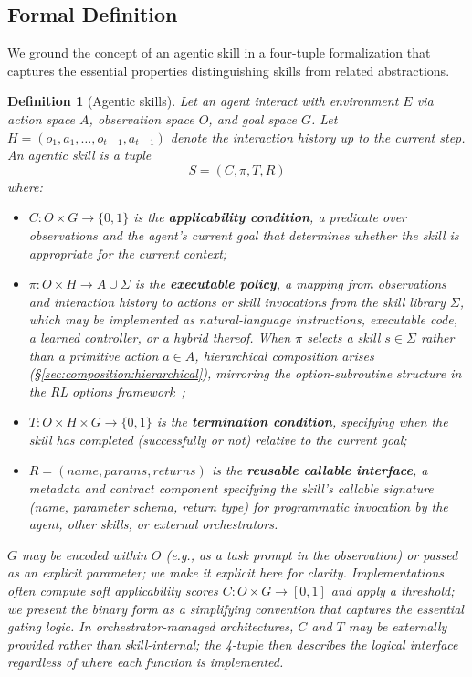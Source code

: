 \documentclass[conference, compsoc]{IEEEtran}
\theoremstyle{plain}
\newtheorem{definition}{Definition}
\begin{document}
\subsection{Formal Definition}
\label{sec:def:formal}

We ground the concept of an agentic skill in a four-tuple formalization that captures the essential properties distinguishing skills from related abstractions.

\begin{definition}[Agentic skills]
Let an agent interact with environment $E$ via action space $A$, observation space $O$, and goal space $G$. Let $H = (o_1, a_1, \ldots, o_{t-1}, a_{t-1})$ denote the interaction history up to the current step. An \emph{agentic skill} is a tuple
\begin{equation}
  S = (C, \pi, T, R)
  \label{eq:skill_def}
\end{equation}
where:
\begin{itemize}[nosep,leftmargin=1em]
  \item $C: O \times G \rightarrow \{0,1\}$ is the \textbf{applicability condition}, a predicate over observations and the agent's current goal that determines whether the skill is appropriate for the current context;
  \item $\pi: O \times H \rightarrow A \cup \Sigma$ is the \textbf{executable policy}, a mapping from observations and interaction history to actions or skill invocations from the skill library $\Sigma$, which may be implemented as natural-language instructions, executable code, a learned controller, or a hybrid thereof. When $\pi$ selects a skill $s \in \Sigma$ rather than a primitive action $a \in A$, hierarchical composition arises (\S\ref{sec:composition:hierarchical}), mirroring the option-subroutine structure in the RL options framework~\cite{sutton1999options};
  \item $T: O \times H \times G \rightarrow \{0,1\}$ is the \textbf{termination condition}, specifying when the skill has completed (successfully or not) relative to the current goal;
  \item $R = (\textit{name}, \textit{params}, \textit{returns})$ is the \textbf{reusable callable interface}, a metadata and contract component specifying the skill's callable signature (name, parameter schema, return type) for programmatic invocation by the agent, other skills, or external orchestrators.
\end{itemize}
$G$ may be encoded within $O$ (e.g., as a task prompt in the observation) or passed as an explicit parameter; we make it explicit here for clarity. Implementations often compute soft applicability scores $C: O \times G \rightarrow [0,1]$ and apply a threshold; we present the binary form as a simplifying convention that captures the essential gating logic. In orchestrator-managed architectures, $C$ and $T$ may be externally provided rather than skill-internal; the 4-tuple then describes the logical interface regardless of where each function is implemented.
\end{definition}
\end{document}
